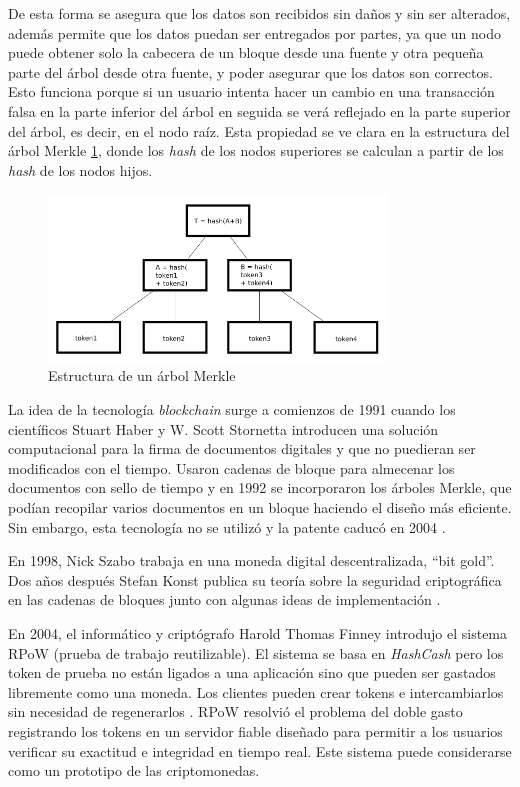 De esta forma se asegura que los datos son recibidos sin daños y sin ser alterados, además permite que los datos puedan ser entregados por partes, ya que un nodo puede obtener solo la cabecera de un bloque desde una fuente y otra pequeña parte del árbol desde otra fuente, y poder asegurar que los datos son correctos. Esto funciona porque si un usuario intenta hacer un cambio en una transacción falsa en la parte inferior del árbol en seguida se verá reflejado en la parte superior del árbol, es decir, en el nodo raíz. Esta propiedad se ve clara en la estructura del árbol Merkle \ref{fig:arbol-Merkle}, donde los \textit{hash} de los nodos superiores se calculan a partir de los \textit{hash} de los nodos hijos.\\

\begin{figure}[h]
	\centering
	\includegraphics[width=0.8\textwidth]{figuras/arbol_merkle.png}
	\caption{Estructura de un árbol Merkle \cite{img-arbol-merkle}}
	\label{fig:arbol-Merkle}
\end{figure}

La idea de la tecnología \textit{blockchain} surge a comienzos de 1991 cuando los científicos Stuart Haber y W. Scott Stornetta introducen una solución computacional para la firma de documentos digitales y que no puedieran ser modificados con el tiempo. Usaron cadenas de bloque para almecenar los documentos con sello de tiempo y en 1992 se incorporaron los árboles Merkle, que podían recopilar varios documentos en un bloque haciendo el diseño más eficiente. Sin embargo, esta tecnología no se utilizó y la patente caducó en 2004 \cite{historia1-block}.

En 1998, Nick Szabo trabaja en una moneda digital descentralizada, ``bit gold''. Dos años después Stefan Konst publica su teoría sobre la seguridad criptográfica en las cadenas de bloques junto con algunas ideas de implementación \cite{historia2-block}.

En 2004, el informático y criptógrafo Harold Thomas Finney introdujo el sistema RPoW (prueba de trabajo reutilizable). El sistema se basa en \textit{HashCash} pero los token de prueba no están ligados a una aplicación sino que pueden ser gastados libremente como una moneda. Los clientes pueden crear tokens e intercambiarlos sin necesidad de regenerarlos \cite{RPoW}. RPoW resolvió el problema del doble gasto registrando los tokens en un servidor fiable diseñado para permitir a los usuarios verificar su exactitud e integridad en tiempo real. Este sistema puede considerarse como un prototipo de las criptomonedas.

